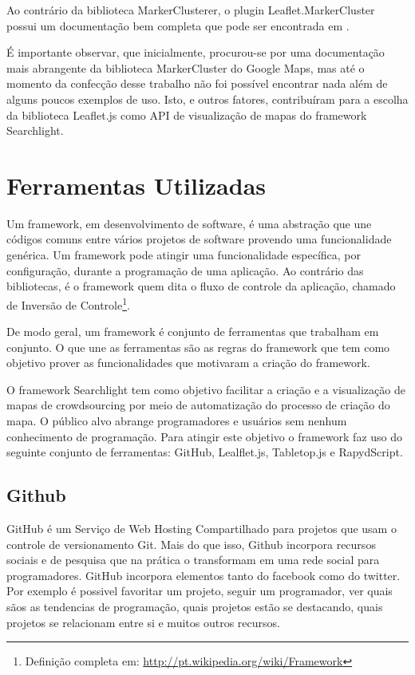 		Ao contrário da biblioteca MarkerClusterer, o plugin Leaflet.MarkerCluster possui um documentação bem completa que pode ser encontrada em \cite{gitleafletmarker}. 
		
		É importante observar, que inicialmente, procurou-se por uma documentação mais abrangente da biblioteca MarkerCluster do Google Maps, mas até o momento da confecção desse trabalho não foi possível encontrar nada além de alguns poucos exemplos de uso. Isto, e outros fatores, contribuíram para a escolha da biblioteca Leaflet.js como API de visualização de mapas do framework Searchlight.
		  

\section{Ferramentas Utilizadas}

Um framework, em desenvolvimento de software, é uma abstração que une códigos comuns entre vários projetos de software provendo uma funcionalidade genérica. Um framework pode atingir uma funcionalidade específica, por configuração, durante a programação de uma aplicação. Ao contrário das bibliotecas, é o framework quem dita o fluxo de controle da aplicação, chamado de Inversão de Controle\footnote{Definição completa em: \url{http://pt.wikipedia.org/wiki/Framework}}.

De modo geral, um framework é conjunto de ferramentas que trabalham em conjunto. O que une as ferramentas são as regras do framework que tem como objetivo prover as funcionalidades que motivaram a criação do framework.

O framework Searchlight tem como objetivo facilitar a criação e a visualização de mapas de crowdsourcing por meio de automatização do processo de criação do mapa. O público alvo abrange  programadores e usuários sem nenhum conhecimento de programação. Para atingir este objetivo o framework faz uso do seguinte conjunto de ferramentas: GitHub, Lealflet.js,  Tabletop.js e RapydScript. 



\subsection{Github}
GitHub é um Serviço de Web Hosting Compartilhado para projetos que usam o controle de versionamento Git. Mais do que isso, Github incorpora recursos sociais e de pesquisa que na prática o transformam em uma rede social para programadores. GitHub incorpora elementos tanto do facebook como do twitter. Por exemplo é possivel favoritar um projeto, seguir um programador, ver quais sãos as tendencias de programação, quais projetos estão se destacando, quais projetos se relacionam entre si e muitos outros recursos.

